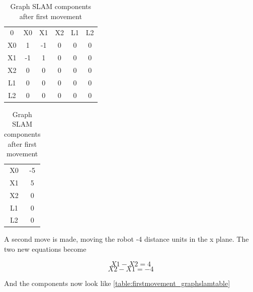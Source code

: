 \documentclass[Main]{subfiles}
\begin{document}
\begin{table}[H]
	\begin{subtable}{0.5\linewidth}
		\centering
	\begin{tabular}{cccccc}
		0 & X0 & X1 & X2 & L1 & L2 \\ 
		X0 & 1 & -1 & 0 & 0 & 0  \\ 
		X1 & -1 & 1 & 0 & 0 & 0  \\ 
		X2 & 0 & 0 & 0 & 0 & 0  \\  
		L1 & 0 & 0 & 0 & 0 & 0  \\ 
		L2 & 0 & 0 & 0 & 0 & 0  \\ 
	\end{tabular}
	\caption{$\Omega$ }
	\end{subtable}
	\begin{subtable}{0.5\linewidth}
		\centering
		\begin{tabular}{cc}
			X0 & -5 \\ 
			X1 & 5 \\ 
			X2 & 0 \\ 
			L1 & 0 \\  
			L2 & 0 \\ 
		\end{tabular}
	\caption{$\xi$}
	\end{subtable}
\caption{Graph SLAM components after first movement}
\label{table:firstmovement_graphslamtable} 
\end{table} \noindent

A second move is made, moving the robot -4 distance units in the x plane. 
The two new equations become

	\begin{equation}
		X1 - X2 = 4
	\end{equation}
	\begin{equation}
		X2 - X1 = -4
	\end{equation}
		
And the components now look like \autoref{table:firstmovement_graphslamtable}
\end{document}
